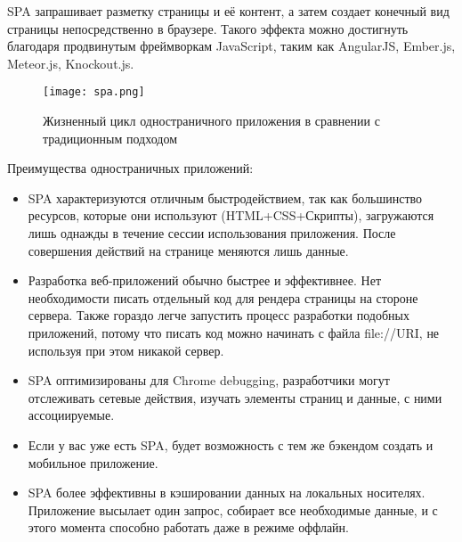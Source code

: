SPA запрашивает разметку страницы и её контент, а затем создает конечный вид страницы непосредственно в браузере. Такого эффекта можно достигнуть благодаря продвинутым
фреймворкам JavaScript, таким как AngularJS\cite{git}, Ember.js\cite{ember}, Meteor.js, Knockout.js\cite{knockout}.

\begin{figure}[ht]
\centering
  \texttt{[image: spa.png]}
  \caption{Жизненный цикл одностраничного приложения в сравнении с традиционным подходом}
  \label{figure:domain:spa}
\end{figure}

Преимущества одностраничных приложений:
\begin{itemize}
\item SPA характеризуются отличным быстродействием, так как большинство ресурсов, которые они используют (HTML+CSS+Скрипты), загружаются лишь однажды в течение сессии 
использования приложения. После совершения действий на странице меняются лишь данные.
\item Разработка веб-приложений обычно быстрее и эффективнее. Нет необходимости писать отдельный код для рендера страницы на стороне сервера. Также гораздо легче 
запустить процесс разработки подобных приложений, потому что писать код можно начинать с файла file://URI, не используя при этом никакой сервер.
\item SPA оптимизированы для Chrome debugging, разработчики могут отслеживать сетевые действия, изучать элементы страниц и данные, с ними ассоциируемые.
\item Если у вас уже есть SPA, будет возможность с тем же бэкендом создать и мобильное приложение.
\item SPA более эффективны в кэшировании данных на локальных носителях. Приложение высылает один запрос, собирает все необходимые данные, и с этого момента
 способно работать даже в режиме оффлайн.
\end{itemize}


